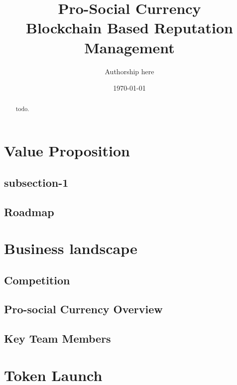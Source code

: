 \documentclass[11pt]{article}
\begin{document}
\title{%
Pro-Social Currency \\[1mm] 
\large Blockchain Based Reputation Management}
\author{Authorship here}
\date{\today}
\maketitle


\begin{abstract}

todo.

\end{abstract}
\pagebreak

\tableofcontents
\pagebreak

\section{Value Proposition}
\label{sec-2}

\subsection{subsection-1}
\label{sec-3-2}

\subsection{Roadmap}
\label{sec-4-5}


\section{Business landscape}
\label{sec-5}
\subsection{Competition}
\label{sec-5-1}


\subsection{\textrm{Pro-social Currency} Overview}
\label{sec-5-3}


\subsection{Key Team Members}
\label{sec-5-4}

\pagebreak

\section{Token Launch}
\label{sec-6}
\end{document}
